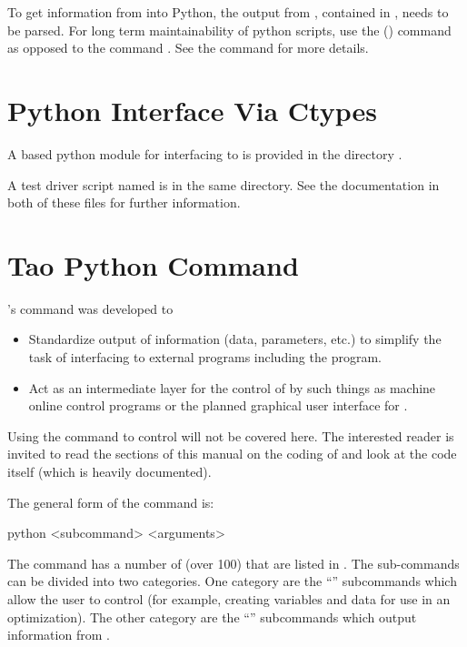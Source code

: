 To get information from \tao into Python, the output from \tao, contained in ,
needs to be parsed. For long term maintainability of python scripts, use the 
() command as opposed to the  command . See the  command for more
details.

\section{Python Interface Via Ctypes}

A  based python module  for interfacing \tao to  is provided in
the directory .

A test driver script named  is in the same directory. See the documentation in
both of these files for further information.

\section{Tao Python Command}
\label{s:python.python}
\tao's  command was developed to
%
\begin{itemize}
\item 
Standardize output of information (data, parameters, etc.) to simplify the task of interfacing \tao
to external programs including the  program.
% 
\item 
Act as an intermediate layer for the control of \tao by such things as machine online control
programs or the planned graphical user interface for \tao.
\end{itemize}
Using the  command to control \tao will not be covered here. The interested reader is
invited to read the sections of this manual on the coding of \tao and look at the \tao code itself
(which is heavily documented).

The general form of the  command is:
\begin{example}
  python <subcommand> <arguments>
\end{example}
The  command has a number of  (over 100) that are listed in
. The sub-commands can be divided into two categories. One category are the
``'' subcommands which allow the user to control \tao (for example, creating variables
and data for use in an optimization). The other category are the ``'' subcommands which
output information from \tao.

